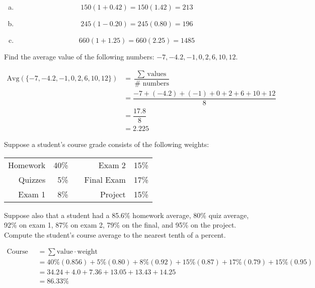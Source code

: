 \documentclass[12pt,letterpaper]{exam}
\begin{document}
\begin{questions}
\sol 
\begin{enumerate}[(a)]
\item 
	\[
	150(1 + 0.42)= 150(1.42)= 213
	\] \pspace

\item 
	\[
	245(1 - 0.20)= 245(0.80)= 196
	\] \pspace

\item 
	\[
	660(1 + 1.25)= 660(2.25)= 1485
	\]
\end{enumerate}



\newpage
\question[10] Find the average value of the following numbers: $-7, -4.2, -1, 0, 2, 6, 10, 12$. \pspace

	\[
	\begin{aligned}
	\text{Avg}(\{-7, -4.2, -1, 0, 2, 6, 10, 12\})&= \dfrac{\sum \text{ values}}{\# \text{ numbers}} \\[0.3cm]
	&= \dfrac{-7 + (-4.2) + (-1) + 0 + 2 + 6 + 10 + 12}{8} \\[0.3cm]
	&= \dfrac{17.8}{8} \\[0.3cm]
	&= 2.225
	\end{aligned}
	\]



\newpage
\question[10] Suppose a student's course grade consists of the following weights: \par
	\begin{table}[!ht]
	\centering
	\begin{tabular}{rrcrr}
	Homework & 40\% & & Exam 2 & 15\% \\
	Quizzes & 5\% & & Final Exam & 17\% \\
	Exam 1 & 8\% & & Project & 15\% \\
	\end{tabular}
	\end{table} \par
Suppose also that a student had a 85.6\% homework average, 80\% quiz average, 92\% on exam 1, 87\% on exam 2, 79\% on the final, and 95\% on the project. Compute the student's course average to the nearest tenth of a percent. \pspace

	\[
	\begin{aligned}
	\text{Course Average}&= \sum \text{value} \cdot \text{weight} \\[0.3cm]
	&= 40\% (0.856) + 5\% (0.80) + 8\% (0.92) + 15\% (0.87) + 17\% (0.79) + 15\% (0.95) \\[0.3cm]
	&= 34.24 + 4.0 + 7.36 + 13.05 + 13.43 + 14.25 \\[0.3cm]
	&= 86.33\%
	\end{aligned}
	\] 




\end{questions}
\end{document}
